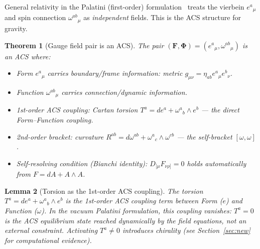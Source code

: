 \documentclass[12pt,a4paper]{article}
\theoremstyle{plain}
\newtheorem{theorem}{Theorem}[section]
\newtheorem{lemma}[theorem]{Lemma}
\theoremstyle{definition}
\theoremstyle{remark}
\newcommand{\FormF}{\mathbf{F}}
\newcommand{\FuncF}{\boldsymbol{\Phi}}
\begin{document}
General relativity in the Palatini (first-order) formulation~\cite{Palatini1919} treats the 
vierbein $e^a{}_\mu$ and spin connection $\omega^{ab}{}_\mu$ as \emph{independent} 
fields.  This is the ACS structure for gravity.

\begin{theorem}[Gauge field pair is an ACS]\label{thm:gravity-acs}
The pair $(\FormF, \FuncF) = (e^a{}_\mu, \omega^{ab}{}_\mu)$ is an ACS where:
\begin{itemize}[noitemsep]
  \item Form $e^a{}_\mu$ carries boundary/frame information: metric $g_{\mu\nu} = \eta_{ab}e^a{}_\mu e^b{}_\nu$.
  \item Function $\omega^{ab}{}_\mu$ carries connection/dynamic information.
  \item 1st-order ACS coupling: Cartan torsion 
    $T^a = de^a + \omega^a{}_b \wedge e^b$ --- the direct Form--Function coupling.
  \item 2nd-order bracket: curvature 
    $R^{ab} = d\omega^{ab} + \omega^a{}_c \wedge \omega^{cb}$ --- the self-bracket $[\omega,\omega]$.
  \item Self-resolving condition (Bianchi identity): 
    $D_{[\mu}F_{\nu\rho]} = 0$ holds automatically from $F = dA + A\wedge A$.
\end{itemize}
\end{theorem}

\begin{lemma}[Torsion as the 1st-order ACS coupling]\label{lem:torsion}\label{thm:C2-closed}
The torsion $T^a = de^a + \omega^a{}_b \wedge e^b$ is the \emph{1st-order
ACS coupling term} between Form ($e$) and Function ($\omega$).  In the
vacuum Palatini formulation, this coupling vanishes: $T^a = 0$ is the
\emph{ACS equilibrium state} reached dynamically by the field equations,
not an external constraint.  Activating $T^a\neq 0$ introduces chirality
(see Section~\ref{sec:new} for computational evidence).
\end{lemma}
\end{document}
